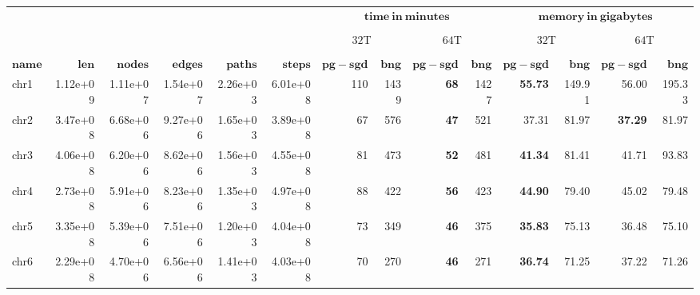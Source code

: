 \begin{table*}[!ht]
	\centering
	\caption{\label{tab:layout} }
	\begin{tabular}{@{}lrrrrrrrrrrrrr@{}}
		& & & & & &  \multicolumn{4}{c}{$\mathbf{time\ in\ minutes}$}  & \multicolumn{4}{c}{$\mathbf{memory\ in\ gigabytes}$}\\ 
	    \cmidrule(lr){7-10} \cmidrule(lr){11-14} \\
		& & & & & & \multicolumn{2}{c}{$32$T} & \multicolumn{2}{c}{$64$T} & \multicolumn{2}{c}{$32$T} & \multicolumn{2}{c}{$64$T}\\
		\cmidrule(lr){7-8} \cmidrule(lr){9-10} \cmidrule(lr){11-12} \cmidrule(lr){13-14} \\
		{$\mathbf{name}$} & {$\mathbf{len}$} & {$\mathbf{nodes}$} & {$\mathbf{edges}$} & {$\mathbf{paths}$} & {$\mathbf{steps}$} & {$\mathbf{pg-sgd}$} & {$\mathbf{bng}$} & {$\mathbf{pg-sgd}$} & {$\mathbf{bng}$} & {$\mathbf{pg-sgd}$} & {$\mathbf{bng}$} & {$\mathbf{pg-sgd}$} & {$\mathbf{bng}$}\\ \hline
		chr1 & 1.12e+09 & 1.11e+07 & 1.54e+07 & 2.26e+03 & 6.01e+08 & 110 & 1439 &  \textbf{68} & 1427 & \textbf{55.73} & 149.91 & 56.00 & 195.33 \\ 
		chr2 & 3.47e+08 & 6.68e+06 & 9.27e+06 & 1.65e+03 & 3.89e+08 & 67 & 576 & \textbf{47} & 521 & 37.31 & 81.97 & \textbf{37.29} & 81.97 \\ 
		chr3 & 4.06e+08 & 6.20e+06 & 8.62e+06 & 1.56e+03 & 4.55e+08 & 81 & 473 & \textbf{52} & 481 & \textbf{41.34} & 81.41 & 41.71 & 93.83 \\ 
		chr4 & 2.73e+08 & 5.91e+06 & 8.23e+06 & 1.35e+03 & 4.97e+08 & 88 & 422 & \textbf{56} & 423 & \textbf{44.90} & 79.40 & 45.02 & 79.48 \\ 
		chr5 & 3.35e+08 & 5.39e+06 & 7.51e+06 & 1.20e+03 & 4.04e+08 & 73 & 349 & \textbf{46} & 375 & \textbf{35.83} & 75.13 & 36.48 & 75.10 \\ 
		chr6 & 2.29e+08 & 4.70e+06 & 6.56e+06 & 1.41e+03 & 4.03e+08 & 70 & 270 & \textbf{46} & 271 & \textbf{36.74} & 71.25 & 37.22 & 71.26 \\ 

\end{tabular}
\end{table*}
